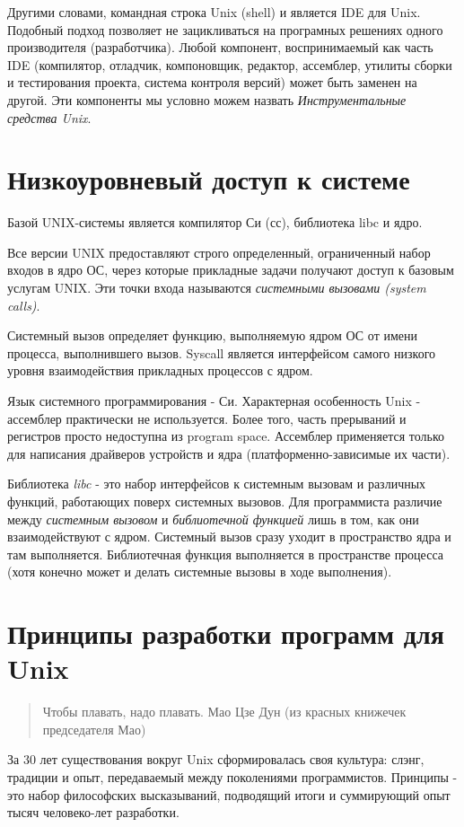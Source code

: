 Другими словами, командная строка Unix (shell) и является IDE для Unix. Подобный подход позволяет не зацикливаться на програмных решениях одного производителя (разработчика). Любой компонент, воспринимаемый как часть IDE (компилятор, отладчик, компоновщик, редактор, ассемблер, утилиты сборки и тестирования проекта, система контроля версий) может быть заменен на другой. Эти компоненты мы условно можем назвать \emph{Инструментальные средства Unix}.

\section{Низкоуровневый доступ к системе}

Базой UNIX-системы является компилятор Си (сс), библиотека libc  и ядро.

Все версии UNIX предоставляют строго определенный, ограниченный набор входов в ядро ОС, через которые прикладные задачи получают доступ к базовым услугам UNIX. Эти точки входа называются \emph{системными вызовами (system calls)}.

Системный вызов определяет функцию, выполняемую ядром ОС от имени процесса, выполнившего вызов. Syscall является интерфейсом самого низкого уровня взаимодействия прикладных процессов с ядром.

Язык системного программирования - Си. Характерная особенность Unix - ассемблер практически не используется. Более того, часть прерываний и регистров просто недоступна из program space. Ассемблер применяется только для написания драйверов устройств и ядра (платформенно-зависимые их части). 

Библиотека \emph{libc} - это набор интерфейсов к системным вызовам и различных функций, работающих поверх системных вызовов. Для программиста различие между \emph{системным вызовом} и \emph{библиотечной функцией} лишь в том, как они взаимодействуют с ядром. Системный вызов сразу уходит в пространство ядра и там выполняется. Библиотечная функция выполняется в пространстве процесса (хотя конечно может и делать системные вызовы в ходе выполнения).


\section{Принципы разработки программ для Unix}
\begin{quote}
Чтобы плавать, надо плавать. Мао Цзе Дун (из красных книжечек председателя Мао)
\end{quote}
За 30 лет существования вокруг Unix сформировалась своя культура: слэнг, традиции и опыт, передаваемый между поколениями программистов. Принципы - это набор философских высказываний, подводящий итоги и суммирующий опыт тысяч человеко-лет разработки.

